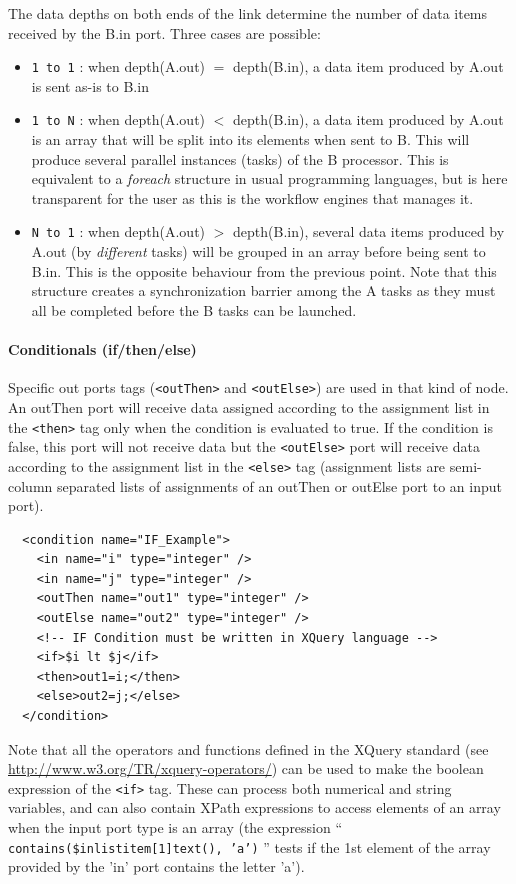 The data depths on both ends of the link determine the number of data
items received by the B.in port. Three cases are possible:
 \begin{itemize}
\item \texttt{1 to 1} : when depth(A.out) $=$ depth(B.in), a data item produced
  by A.out is sent as-is to B.in
\item \texttt{1 to N} : when depth(A.out) $<$ depth(B.in), a data item produced
  by A.out is an array that will be split into its elements when sent to
  B. This will produce several parallel instances (tasks) of the B
  processor. This is equivalent to a \textit{foreach} structure in usual
  programming languages, but is here transparent for the user as this is the
  workflow engines that manages it.
\item \texttt{N to 1} : when depth(A.out) $>$ depth(B.in), several data items
  produced by A.out (by \textit{different} tasks) will be grouped in an array
  before being sent to B.in. This is the opposite behaviour from the previous
  point. Note that this structure creates a synchronization barrier among the A
  tasks as they must all be completed before the B tasks can be launched.
 \end{itemize}

\paragraph{Conditionals (if/then/else)} Specific out ports tags (\texttt{<outThen>} and \texttt{<outElse>}) are
used in that kind of node. An outThen port will receive data assigned according
to the assignment list in the \texttt{<then>} tag only when the condition is
evaluated to true. If the condition is false, this port will not receive data
but the \texttt{<outElse>} port will receive data according to the assignment
list in the \texttt{<else>} tag (assignment lists are semi-column separated
lists of assignments of an outThen or outElse port to an input port).
\begin{verbatim}
  <condition name="IF_Example">
    <in name="i" type="integer" />
    <in name="j" type="integer" />
    <outThen name="out1" type="integer" />
    <outElse name="out2" type="integer" />
    <!-- IF Condition must be written in XQuery language -->
    <if>$i lt $j</if>
    <then>out1=i;</then>
    <else>out2=j;</else>
  </condition>
\end{verbatim}
Note that all the operators and functions defined in the XQuery standard (see
\url{http://www.w3.org/TR/xquery-operators/}) can be used to make the boolean
expression of the \texttt{<if>} tag. These can process both numerical and
string variables, and can also contain XPath expressions to access elements of
an array when the input port type is an array (\eg the expression ``
\texttt{contains(\$in\/list\/item[1]\/text(), 'a')} '' tests if the 1st element
of the array provided by the 'in' port contains the letter 'a').


